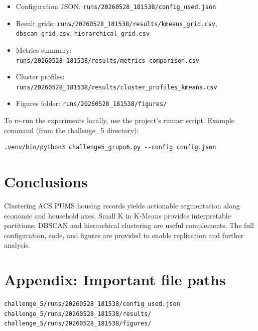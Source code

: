 \documentclass[11pt,a4paper]{article}
\begin{document}
\begin{itemize}
  \item Configuration JSON: \texttt{runs/20260528_181538/config_used.json}
  \item Result grids: \texttt{runs/20260528_181538/results/kmeans_grid.csv}, \texttt{dbscan_grid.csv}, \texttt{hierarchical_grid.csv}
  \item Metrics summary: \texttt{runs/20260528_181538/results/metrics_comparison.csv}
  \item Cluster profiles: \texttt{runs/20260528_181538/results/cluster_profiles_kmeans.csv}
  \item Figures folder: \texttt{runs/20260528_181538/figures/}
\end{itemize}

To re-run the experiments locally, use the project's runner script. Example command (from the challenge_5 directory):
\begin{verbatim}
.venv/bin/python3 challenge5_grupo6.py --config config.json
\end{verbatim}

\section{Conclusions}
Clustering ACS PUMS housing records yields actionable segmentation along economic and household axes. Small K in K‑Means provides interpretable partitions; DBSCAN and hierarchical clustering are useful complements. The full configuration, code, and figures are provided to enable replication and further analysis.

\section*{Appendix: Important file paths}
\begin{verbatim}
challenge_5/runs/20260528_181538/config_used.json
challenge_5/runs/20260528_181538/results/
challenge_5/runs/20260528_181538/figures/
\end{verbatim}
\end{document}
